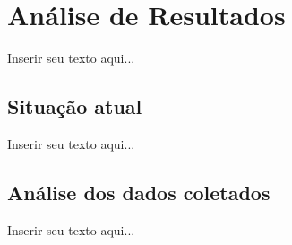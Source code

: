%
%

\chapter{Análise de Resultados}

Inserir seu texto aqui...

\section{Situação atual}

Inserir seu texto aqui...

\section{Análise dos dados coletados}

Inserir seu texto aqui...
